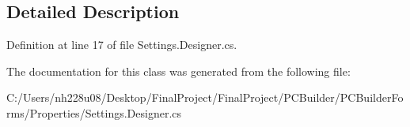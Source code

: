 \subsection{Detailed Description}


Definition at line 17 of file Settings.\+Designer.\+cs.



The documentation for this class was generated from the following file\+:\begin{DoxyCompactItemize}
\item 
C\+:/\+Users/nh228u08/\+Desktop/\+Final\+Project/\+Final\+Project/\+P\+C\+Builder/\+P\+C\+Builder\+Forms/\+Properties/Settings.\+Designer.\+cs\end{DoxyCompactItemize}
